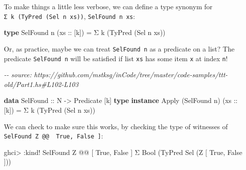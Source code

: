 \documentclass[]{article}
\newenvironment{Shaded}{}{}
\newcommand{\CommentTok}[1]{\textcolor[rgb]{0.38,0.63,0.69}{\textit{#1}}}
\newcommand{\DataTypeTok}[1]{\textcolor[rgb]{0.56,0.13,0.00}{#1}}
\newcommand{\KeywordTok}[1]{\textcolor[rgb]{0.00,0.44,0.13}{\textbf{#1}}}
\newcommand{\NormalTok}[1]{#1}
\newcommand{\OperatorTok}[1]{\textcolor[rgb]{0.40,0.40,0.40}{#1}}
\newcommand{\OtherTok}[1]{\textcolor[rgb]{0.00,0.44,0.13}{#1}}
\begin{document}
To make things a little less verbose, we can define a type synonym for
\texttt{Σ\ k\ (TyPred\ (Sel\ n\ xs))}, \texttt{SelFound\ n\ xs}:

\begin{Shaded}
\begin{Highlighting}[]
\KeywordTok{type} \DataTypeTok{SelFound}\NormalTok{ n (}\OtherTok{xs ::}\NormalTok{ [k]) }\OtherTok{=}\NormalTok{ Σ k (}\DataTypeTok{TyPred}\NormalTok{ (}\DataTypeTok{Sel}\NormalTok{ n xs))}
\end{Highlighting}
\end{Shaded}

Or, as practice, maybe we can treat \texttt{SelFound\ n} as a predicate on a
list? The predicate \texttt{SelFound\ n} will be satisfied if list \texttt{xs}
has some item \texttt{x} at index \texttt{n}!

\begin{Shaded}
\begin{Highlighting}[]
\CommentTok{{-}{-} source: https://github.com/mstksg/inCode/tree/master/code{-}samples/ttt{-}old/Part1.hs\#L102{-}L103}

\KeywordTok{data} \DataTypeTok{SelFound}\OtherTok{ ::} \DataTypeTok{N} \OtherTok{{-}\textgreater{}} \DataTypeTok{Predicate}\NormalTok{ [k]}
\KeywordTok{type} \KeywordTok{instance} \DataTypeTok{Apply}\NormalTok{ (}\DataTypeTok{SelFound}\NormalTok{ n) (}\OtherTok{xs ::}\NormalTok{ [k]) }\OtherTok{=}\NormalTok{ Σ k (}\DataTypeTok{TyPred}\NormalTok{ (}\DataTypeTok{Sel}\NormalTok{ n xs))}
\end{Highlighting}
\end{Shaded}

We can check to make sure this works, by checking the type of witnesses of
\texttt{SelFound\ \textquotesingle{}Z\ @@\ \textquotesingle{}{[}\ \textquotesingle{}True,\ \textquotesingle{}False\ {]}}:

\begin{Shaded}
\begin{Highlighting}[]
\NormalTok{ghci}\OperatorTok{\textgreater{}} \OperatorTok{:}\NormalTok{kind}\OperatorTok{!} \DataTypeTok{SelFound} \DataTypeTok{\textquotesingle{}Z} \OperatorTok{@@}\NormalTok{ \textquotesingle{}[ }\DataTypeTok{\textquotesingle{}True}\NormalTok{, }\DataTypeTok{\textquotesingle{}False}\NormalTok{ ]}
\NormalTok{Σ }\DataTypeTok{Bool}\NormalTok{ (}\DataTypeTok{TyPred} \DataTypeTok{Sel}\NormalTok{ (}\DataTypeTok{\textquotesingle{}Z}\NormalTok{ \textquotesingle{}[ }\DataTypeTok{\textquotesingle{}True}\NormalTok{, }\DataTypeTok{\textquotesingle{}False}\NormalTok{ ]))}
\end{Highlighting}
\end{Shaded}
\end{document}
